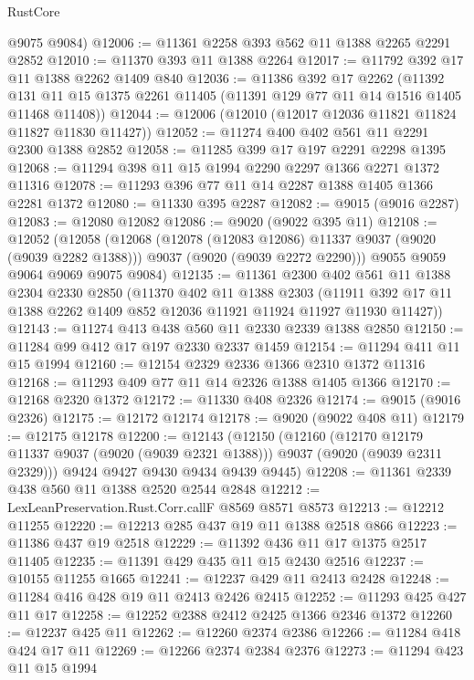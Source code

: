 \begin{lexlean}{RustCore}
\begin{coremodule}
      @9075
      @9084)
@12006 := @11361 @2258 @393 @562 @11 @1388 @2265 @2291 @2852
@12010 := @11370 @393 @11 @1388 @2264
@12017 := @11792 @392 @17 @11 @1388 @2262 @1409 @840
@12036 := @11386
    @392
    @17
    @2262
    (@11392 @131 @11 @15 @1375 @2261 @11405 (@11391 @129 @77 @11 @14 @1516 @1405 @11468 @11408))
@12044 := @12006 (@12010 (@12017 @12036 @11821 @11824 @11827 @11830 @11427))
@12052 := @11274 @400 @402 @561 @11 @2291 @2300 @1388 @2852
@12058 := @11285 @399 @17 @197 @2291 @2298 @1395
@12068 := @11294 @398 @11 @15 @1994 @2290 @2297 @1366 @2271 @1372 @11316
@12078 := @11293 @396 @77 @11 @14 @2287 @1388 @1405 @1366 @2281 @1372
@12080 := @11330 @395 @2287
@12082 := @9015 (@9016 @2287)
@12083 := @12080 @12082
@12086 := @9020 (@9022 @395 @11)
@12108 := @12052
    (@12058
      (@12068
        (@12078 (@12083 @12086) @11337 @9037 (@9020 (@9039 @2282 @1388)))
        @9037
        (@9020 (@9039 @2272 @2290)))
      @9055
      @9059
      @9064
      @9069
      @9075
      @9084)
@12135 := @11361
    @2300
    @402
    @561
    @11
    @1388
    @2304
    @2330
    @2850
    (@11370
      @402
      @11
      @1388
      @2303
      (@11911 @392 @17 @11 @1388 @2262 @1409 @852 @12036 @11921 @11924 @11927 @11930 @11427))
@12143 := @11274 @413 @438 @560 @11 @2330 @2339 @1388 @2850
@12150 := @11284 @99 @412 @17 @197 @2330 @2337 @1459
@12154 := @11294 @411 @11 @15 @1994
@12160 := @12154 @2329 @2336 @1366 @2310 @1372 @11316
@12168 := @11293 @409 @77 @11 @14 @2326 @1388 @1405 @1366
@12170 := @12168 @2320 @1372
@12172 := @11330 @408 @2326
@12174 := @9015 (@9016 @2326)
@12175 := @12172 @12174
@12178 := @9020 (@9022 @408 @11)
@12179 := @12175 @12178
@12200 := @12143
    (@12150
      (@12160
        (@12170 @12179 @11337 @9037 (@9020 (@9039 @2321 @1388)))
        @9037
        (@9020 (@9039 @2311 @2329)))
      @9424
      @9427
      @9430
      @9434
      @9439
      @9445)
@12208 := @11361 @2339 @438 @560 @11 @1388 @2520 @2544 @2848
@12212 := LexLeanPreservation.Rust.Corr.callF @8569 @8571 @8573
@12213 := @12212 @11255
@12220 := @12213 @285 @437 @19 @11 @1388 @2518 @866
@12223 := @11386 @437 @19 @2518
@12229 := @11392 @436 @11 @17 @1375 @2517 @11405
@12235 := @11391 @429 @435 @11 @15 @2430 @2516
@12237 := @10155 @11255 @1665
@12241 := @12237 @429 @11 @2413 @2428
@12248 := @11284 @416 @428 @19 @11 @2413 @2426 @2415
@12252 := @11293 @425 @427 @11 @17
@12258 := @12252 @2388 @2412 @2425 @1366 @2346 @1372
@12260 := @12237 @425 @11
@12262 := @12260 @2374 @2386
@12266 := @11284 @418 @424 @17 @11
@12269 := @12266 @2374 @2384 @2376
@12273 := @11294 @423 @11 @15 @1994

\end{coremodule}
\end{lexlean}
